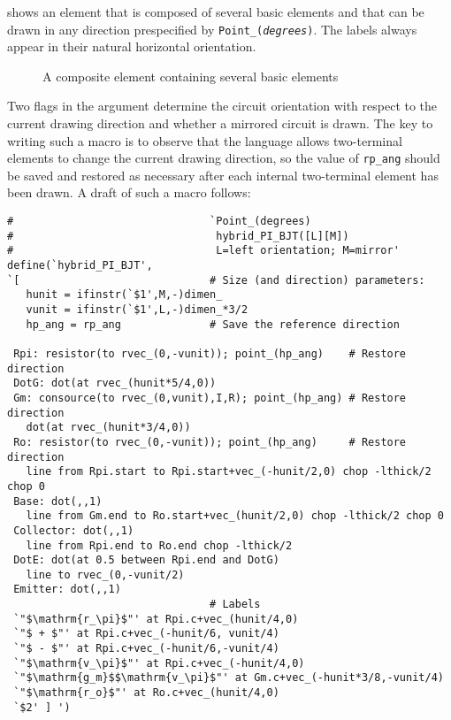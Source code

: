  shows an element that is composed of several basic
elements and that can be drawn in any direction prespecified by
{\tt Point\_({\sl degrees})}. The labels always appear in their natural
horizontal orientation.
\begin{figure}[H]
   \vspace*{-0.5ex}
   
   \vspace*{-0.5ex}
   \caption{A composite element containing several basic elements}
   \label{HybridPi}
   \end{figure}
Two flags in the argument determine the circuit orientation with respect to
the current drawing direction and whether a mirrored circuit is drawn.  
The key to writing such a macro is to observe that the \pic language
allows two-terminal elements to change the current drawing direction,
so the value of {\tt rp\_ang} should be saved and restored as necessary
after each internal two-terminal element has been drawn.
A draft of such a macro follows:
\begin{verbatim}
#                               `Point_(degrees)
#                                hybrid_PI_BJT([L][M])
#                                L=left orientation; M=mirror'
define(`hybrid_PI_BJT',
`[                              # Size (and direction) parameters:
   hunit = ifinstr(`$1',M,-)dimen_
   vunit = ifinstr(`$1',L,-)dimen_*3/2
   hp_ang = rp_ang              # Save the reference direction

 Rpi: resistor(to rvec_(0,-vunit)); point_(hp_ang)    # Restore direction
 DotG: dot(at rvec_(hunit*5/4,0))
 Gm: consource(to rvec_(0,vunit),I,R); point_(hp_ang) # Restore direction
   dot(at rvec_(hunit*3/4,0))
 Ro: resistor(to rvec_(0,-vunit)); point_(hp_ang)     # Restore direction
   line from Rpi.start to Rpi.start+vec_(-hunit/2,0) chop -lthick/2 chop 0
 Base: dot(,,1)
   line from Gm.end to Ro.start+vec_(hunit/2,0) chop -lthick/2 chop 0
 Collector: dot(,,1)
   line from Rpi.end to Ro.end chop -lthick/2
 DotE: dot(at 0.5 between Rpi.end and DotG)
   line to rvec_(0,-vunit/2)
 Emitter: dot(,,1)
                                # Labels
 `"$\mathrm{r_\pi}$"' at Rpi.c+vec_(hunit/4,0)
 `"$ + $"' at Rpi.c+vec_(-hunit/6, vunit/4)
 `"$ - $"' at Rpi.c+vec_(-hunit/6,-vunit/4)
 `"$\mathrm{v_\pi}$"' at Rpi.c+vec_(-hunit/4,0)
 `"$\mathrm{g_m}$$\mathrm{v_\pi}$"' at Gm.c+vec_(-hunit*3/8,-vunit/4)
 `"$\mathrm{r_o}$"' at Ro.c+vec_(hunit/4,0)
 `$2' ] ')
\end{verbatim}

